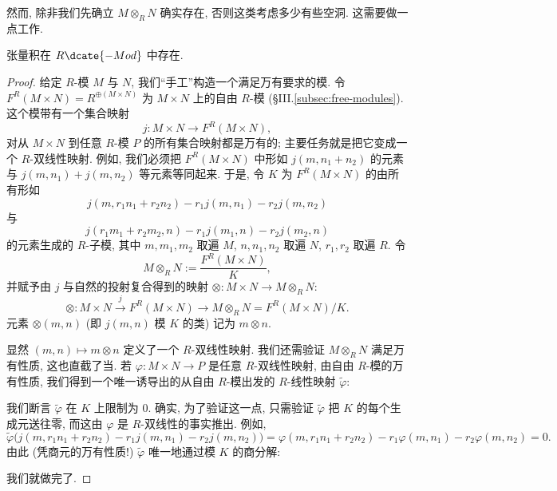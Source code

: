 然而, 除非我们先确立 $M\otimes_R N$ 确实存在, 否则这类考虑多少有些空洞. 这需要做一点工作.

\begin{lemma}\label{lem:tensor-exists}
张量积在 $R\dcate{-Mod}$ 中存在.
\end{lemma}

\begin{proof}
给定 $R$-模 $M$ 与 $N$, 我们``手工''构造一个满足万有要求的模. 令 $F^R(M\times N)=R^{\oplus(M\times N)}$ 为 $M\times N$ 上的自由 $R$-模 (§III.\ref{subsec:free-modules}). 这个模带有一个集合映射
\[
j:M\times N\to F^R(M\times N),
\]
对从 $M\times N$ 到任意 $R$-模 $P$ 的所有集合映射都是万有的; 主要任务就是把它变成一个 $R$-双线性映射. 例如, 我们必须把 $F^R(M\times N)$ 中形如 $j(m,n_1+n_2)$ 的元素与 $j(m,n_1)+j(m,n_2)$ 等元素等同起来. 于是, 令 $K$ 为 $F^R(M\times N)$ 的由所有形如
\[
j(m,r_1n_1+r_2n_2)-r_1j(m,n_1)-r_2j(m,n_2)
\]
与
\[
j(r_1m_1+r_2m_2,n)-r_1j(m_1,n)-r_2j(m_2,n)
\]
的元素生成的 $R$-子模, 其中 $m,m_1,m_2$ 取遍 $M$, $n,n_1,n_2$ 取遍 $N$, $r_1,r_2$ 取遍 $R$. 令
\[
M\otimes_R N:=\frac{F^R(M\times N)}{K},
\]
并赋予由 $j$ 与自然的投射复合得到的映射 $\otimes:M\times N\to M\otimes_R N$:
\[
\otimes:M\times N\xrightarrow{j} F^R(M\times N)\longrightarrow M\otimes_R N=F^R(M\times N)/K.
\]
元素 $\otimes(m,n)$ (即 $j(m,n)$ 模 $K$ 的类) 记为 $m\otimes n$.

显然 $(m,n)\mapsto m\otimes n$ 定义了一个 $R$-双线性映射. 我们还需验证 $M\otimes_R N$ 满足万有性质, 这也直截了当. 若 $\varphi:M\times N\to P$ 是任意 $R$-双线性映射, 由自由 $R$-模的万有性质, 我们得到一个唯一诱导出的从自由 $R$-模出发的 $R$-线性映射 $\tilde{\varphi}$:
\begin{center}
\end{center}
我们断言 $\tilde{\varphi}$ 在 $K$ 上限制为 $0$. 确实, 为了验证这一点, 只需验证 $\tilde{\varphi}$ 把 $K$ 的每个生成元送往零, 而这由 $\varphi$ 是 $R$-双线性的事实推出. 例如,
\[
\tilde{\varphi}\bigl(j(m,r_1n_1+r_2n_2)-r_1j(m,n_1)-r_2j(m,n_2)\bigr)
=\varphi(m,r_1n_1+r_2n_2)-r_1\varphi(m,n_1)-r_2\varphi(m,n_2)=0.
\]
由此 (凭商元的万有性质!) $\tilde{\varphi}$ 唯一地通过模 $K$ 的商分解:
\begin{center}
\end{center}
我们就做完了.
\end{proof}

